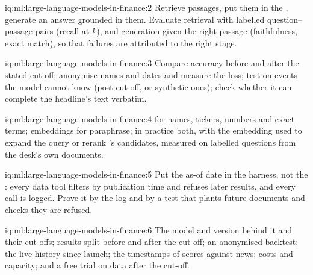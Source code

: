 \begin{solution}{iq:ml:large-language-models-in-finance:2}
Retrieve passages, put them in the , generate an answer grounded in them. Evaluate retrieval with labelled
question--passage pairs (recall at $k$), and generation given the right passage (faithfulness, exact match), so that
failures are attributed to the right stage.
\end{solution}

\begin{solution}{iq:ml:large-language-models-in-finance:3}
Compare accuracy before and after the stated cut-off; anonymise names and dates and measure the loss; test on events the
model cannot know (post-cut-off, or synthetic ones); check whether it can complete the headline's text verbatim.
\end{solution}

\begin{solution}{iq:ml:large-language-models-in-finance:4}
 for names, tickers, numbers and exact terms; embeddings for paraphrase; in practice both, with the embedding used to
expand the query or rerank 's candidates, measured on labelled questions from the desk's own documents.
\end{solution}

\begin{solution}{iq:ml:large-language-models-in-finance:5}
Put the as-of date in the harness, not the : every data tool filters by publication time and refuses later results,
and every call is logged. Prove it by the log and by a test that plants future documents and checks they are refused.
\end{solution}

\begin{solution}{iq:ml:large-language-models-in-finance:6}
The model and version behind it and their cut-offs; results split before and after the cut-off; an anonymised backtest; the
live history since launch; the timestamps of scores against news; costs and capacity; and a free trial on data after the
cut-off.
\end{solution}
